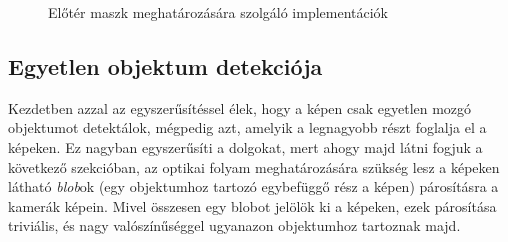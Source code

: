 \begin{figure}[tbh]
\centering


\caption{Előtér maszk meghatározására szolgáló implementációk \label{fig:cd:fg-mask-calc}}
\end{figure}

\subsection{Egyetlen objektum detekciója}

Kezdetben azzal az egyszerűsítéssel élek, hogy a képen csak egyetlen mozgó objektumot detektálok, mégpedig azt, amelyik a legnagyobb részt foglalja el a képeken. Ez nagyban egyszerűsíti a dolgokat, mert ahogy majd látni fogjuk a következő szekcióban, az optikai folyam meghatározására szükség lesz a képeken látható \textit{blob}ok (egy objektumhoz tartozó egybefüggő rész a képen) párosításra a kamerák képein. Mivel összesen egy blobot jelölök ki a képeken, ezek párosítása triviális, és nagy valószínűséggel ugyanazon objektumhoz tartoznak majd.

